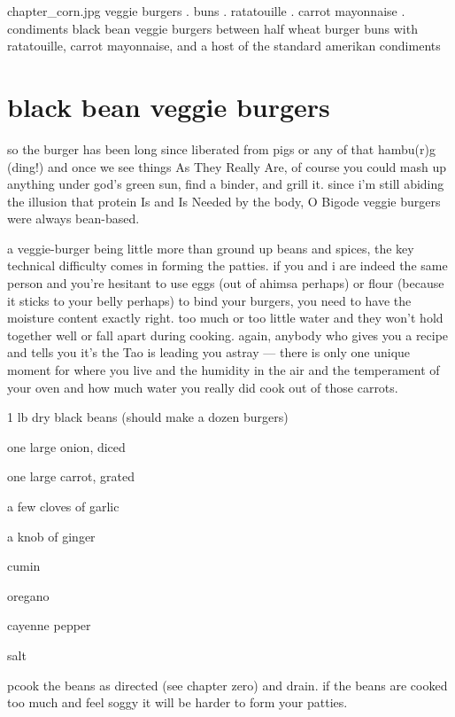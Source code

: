 \mychapter
{chapter_corn.jpg}
{veggie burgers . buns . ratatouille . carrot mayonnaise . condiments}
{black bean veggie burgers between half wheat burger buns with
ratatouille, carrot mayonnaise, and a host of the standard amerikan
condiments}

\section{black bean veggie burgers}

so the burger has been long since liberated from pigs or any of that hambu(r)g 
(ding!) and once we see things As They Really Are, of course you could mash up 
anything under god's green sun, find a binder, and grill it. since i'm still 
abiding the illusion that protein Is and Is Needed by the body, O Bigode veggie 
burgers were always bean-based.

a veggie-burger being little more than ground up beans and spices, the key 
technical difficulty comes in forming the patties. if you and i are indeed the 
same person and you're hesitant to use eggs (out of ahimsa perhaps) or flour 
(because it sticks to your belly perhaps) to bind your burgers, you need to 
have the moisture content exactly right. too much or too little water and they 
won't hold together well or fall apart during cooking. again, anybody who gives 
you a recipe and tells you it's the Tao is leading you astray --- there is only 
one unique moment for where you live and the humidity in the air and the 
temperament of your oven and how much water you really did cook out of those 
carrots.

\begin{ingredients}
  \item 1 lb dry black beans (should make a dozen burgers)
  \item one large onion, diced
  \item one large carrot, grated
  \item a few cloves of garlic
  \item a knob of ginger
  \item cumin
  \item oregano
  \item cayenne pepper
  \item salt
\end{ingredients}

pcook the beans as directed (see chapter zero) and drain. if the beans are 
cooked too much and feel soggy it will be harder to form your patties.

